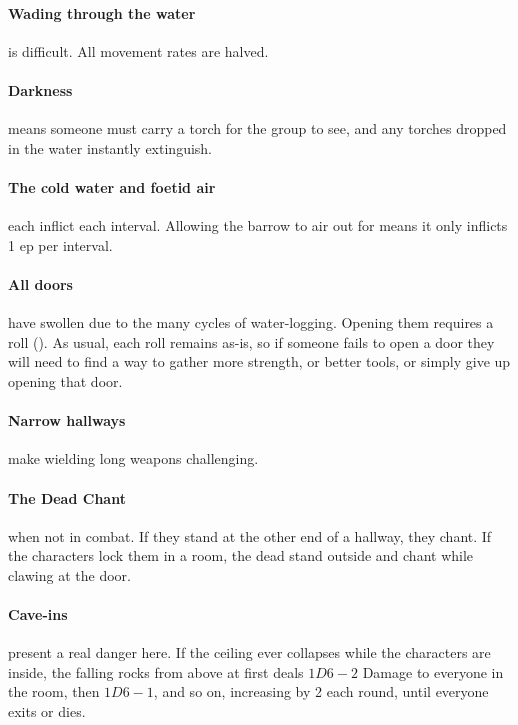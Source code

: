 \paragraph{Wading through the water}
is difficult.
All movement rates are halved.

\paragraph{Darkness}
means someone must carry a torch for the group to see, and any torches dropped in the water instantly extinguish.

\paragraph{The cold water and foetid air}
each inflict  each \gls{interval}.
Allowing the barrow to air out for  means it only inflicts 1 \gls{ep} per \gls{interval}.

\paragraph{All doors}
have swollen due to the many \glspl{cycle} of water-logging.
Opening them requires a  roll (\tn[10]).
As usual, each roll remains as-is, so if someone fails to open a door they will need to find a way to gather more strength, or better tools, or simply give up opening that door.

\paragraph{Narrow hallways}
make wielding long weapons challenging.%

\paragraph{The Dead Chant} when not in combat.
If they stand at the other end of a hallway, they chant.
If the characters lock them in a room, the dead stand outside and chant while clawing at the door.

\paragraph{Cave-ins} present a real danger here.  If the ceiling ever collapses while the characters are inside, the falling rocks from above at first deals $1D6-2$ Damage to everyone in the room, then $1D6-1$, and so on, increasing by 2 each round, until everyone exits or dies.

